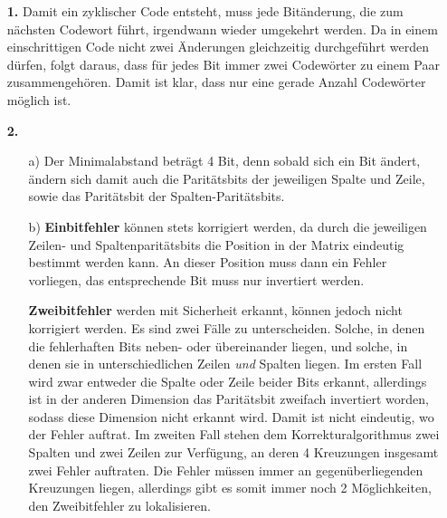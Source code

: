 \documentclass[a4paper,10pt]{scrartcl}
\author{\authorinfo}
\title{\titleinfo}
\date{\today}
\begin{document}
\setcounter{secnumdepth}{0}
\maketitle

\setcounter{MaxMatrixCols}{31}



\begin{enumerate}
    \item[\textbf{1.}]
        Damit ein zyklischer Code entsteht, muss jede Bitänderung, die zum nächsten Codewort
        führt, irgendwann wieder umgekehrt werden. Da in einem einschrittigen Code nicht zwei
        Änderungen gleichzeitig durchgeführt werden dürfen, folgt daraus, dass für jedes Bit
        immer zwei Codewörter zu einem Paar zusammengehören. Damit ist klar, dass nur eine
        gerade Anzahl Codewörter möglich ist.

    \item[\textbf{2.}]
    \begin{enumerate}
        \item[a)]
            Der Minimalabstand beträgt 4 Bit, denn sobald sich ein Bit ändert, ändern
            sich damit auch die Paritätsbits der jeweiligen Spalte und Zeile, sowie das
            Paritätsbit der Spalten-Paritätsbits.

        \item[b)]
            \textbf{Einbitfehler} können stets korrigiert werden, da durch die jeweiligen
            Zeilen- und Spaltenparitätsbits die Position in der Matrix eindeutig bestimmt
            werden kann. An dieser Position muss dann ein Fehler vorliegen, das entsprechende
            Bit muss nur invertiert werden.

            \textbf{Zweibitfehler} werden mit Sicherheit erkannt, können jedoch nicht
            korrigiert werden. Es sind zwei Fälle zu unterscheiden. Solche, in denen die
            fehlerhaften Bits neben- oder übereinander liegen, und solche, in denen sie in
            unterschiedlichen Zeilen \emph{und} Spalten liegen. Im ersten Fall wird zwar
            entweder die Spalte oder Zeile beider Bits erkannt, allerdings ist in der anderen
            Dimension das Paritätsbit zweifach invertiert worden, sodass diese Dimension nicht
            erkannt wird. Damit ist nicht eindeutig, wo der Fehler auftrat. Im zweiten Fall
            stehen dem Korrekturalgorithmus zwei Spalten und zwei Zeilen zur Verfügung, an
            deren 4 Kreuzungen insgesamt zwei Fehler auftraten. Die Fehler müssen immer an
            gegenüberliegenden Kreuzungen liegen, allerdings gibt es somit immer noch 2
            Möglichkeiten, den Zweibitfehler zu lokalisieren.


\end{enumerate}
\end{enumerate}
\end{document}
